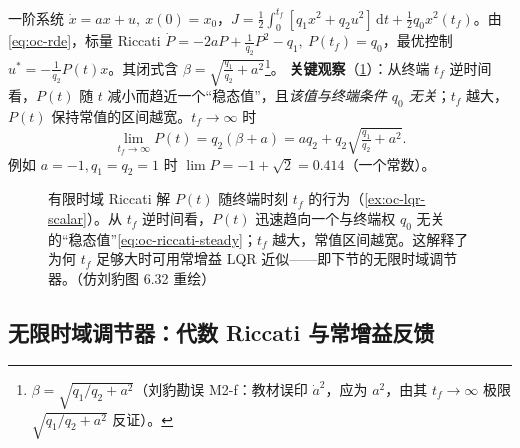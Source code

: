 \begin{example}\label{ex:oc-lqr-scalar}
一阶系统 $\dot x=ax+u,\ x(0)=x_0$，$J=\tfrac12\int_0^{t_f}[q_1x^2+q_2u^2]\,\mathrm dt+\tfrac12q_0x^2(t_f)$。由 \cref{eq:oc-rde}，标量 Riccati $\dot P=-2aP+\tfrac1{q_2}P^2-q_1,\ P(t_f)=q_0$，最优控制 $u^*=-\tfrac1{q_2}P(t)x$。其闭式含 $\beta=\sqrt{\tfrac{q_1}{q_2}+a^2}$\footnote{$\beta=\sqrt{q_1/q_2+a^2}$（刘豹勘误 M2-f：教材误印 $\dot a^2$，应为 $a^2$，由其 $t_f\to\infty$ 极限 $\sqrt{q_1/q_2+a^2}$ 反证）。}。
\textbf{关键观察}（\cref{fig:oc-riccati}）：从终端 $t_f$ 逆时间看，$P(t)$ 随 $t$ 减小而趋近一个“稳态值”，且\emph{该值与终端条件 $q_0$ 无关}；$t_f$ 越大，$P(t)$ 保持常值的区间越宽。$t_f\to\infty$ 时
\begin{equation}
  \lim_{t_f\to\infty}P(t)=q_2(\beta+a)=aq_2+q_2\sqrt{\tfrac{q_1}{q_2}+a^2}.
  \label{eq:oc-riccati-steady}
\end{equation}
例如 $a=-1,q_1=q_2=1$ 时 $\lim P=-1+\sqrt2=0.414$（一个常数）。
\end{example}

\begin{figure}[ht]
\centering
{}
\caption{有限时域 Riccati 解 $P(t)$ 随终端时刻 $t_f$ 的行为（\cref{ex:oc-lqr-scalar}）。从 $t_f$ 逆时间看，$P(t)$ 迅速趋向一个与终端权 $q_0$ 无关的“稳态值”\cref{eq:oc-riccati-steady}；$t_f$ 越大，常值区间越宽。这解释了为何 $t_f$ 足够大时可用常增益 LQR 近似——即下节的无限时域调节器。（仿刘豹图 6.32 重绘）}
\label{fig:oc-riccati}
\end{figure}

\subsection{无限时域调节器：代数 Riccati 与常增益反馈}
\label{sec:oc-infinite-regulator}

